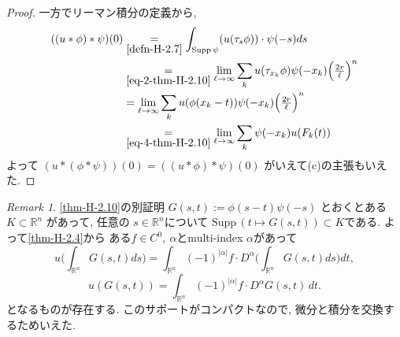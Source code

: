 \documentclass[dvipdfmx,a4paper,11pt]{article} %
\theoremstyle{definition}
\theoremstyle{remark}
\newtheorem{rem}[thm]{Remark}
\numberwithin{equation}{section}
\begin{document}
\begin{proof}
一方でリーマン積分の定義から, 
\begin{align*}
((u \ast \phi) \ast \psi)(0) 
&\underset{\eqref{defn-H-2.7}}{=} \int_{\mathrm{Supp}\,\psi} (u(\tau_s \phi)) \cdot \psi(-s) ds\\
&\underset{\eqref{eq-2-thm-H-2.10}}{=}\lim_{\ell \to \infty} \sum_k u(\tau_{x_k}\phi) \psi(-x_k) \Big(\tfrac{2r}{\ell}\Big)^n\\
&= \lim_{\ell \to \infty} \sum_k u(\phi(x_k - t)) \psi(-x_k) \Big(\tfrac{2r}{\ell}\Big)^n \\
&\underset{\eqref{eq-4-thm-H-2.10}}{=} \lim_{\ell \to \infty} \sum_k \psi(-x_k) u(F_k(t))\\
\end{align*}
よって
\( (u \ast (\phi \ast \psi))(0) = ((u \ast \phi) \ast \psi)(0)\) がいえて(c)の主張もいえた. 
\end{proof}

\begin{rem}
\ref{thm-H-2.10}の別証明
\(G(s,t) := \phi(s-t)\psi(-s)\)
とおくとある
\( K \subset \mathbb{R}^n\) があって, 任意の \( s \in \mathbb{R}^n\)について
\(\mathrm{Supp}\,(t \mapsto G(s,t)) \subset K\)である. 
よって\ref{thm-H-2.4}から
ある\( f \in C^0, \ \alpha\)とmulti-index $\alpha$があって
\[
u\Big(\int_{\mathbb{R}^n} G(s,t) ds\Big)
= \int_{\mathbb{R}^n} (-1)^{|\alpha|} f \cdot D^\alpha \Big(\int_{\mathbb{R}^n} G(s,t) ds\Big) dt,
\]
\[ 
u(G(s,t)) = \int_{\mathbb{R}^n} (-1)^{|\alpha|} f \cdot D^\alpha G(s,t) \, dt.
\]
となるものが存在する. このサポートがコンパクトなので, 微分と積分を交換するためいえた.
\end{rem}
\end{document}
